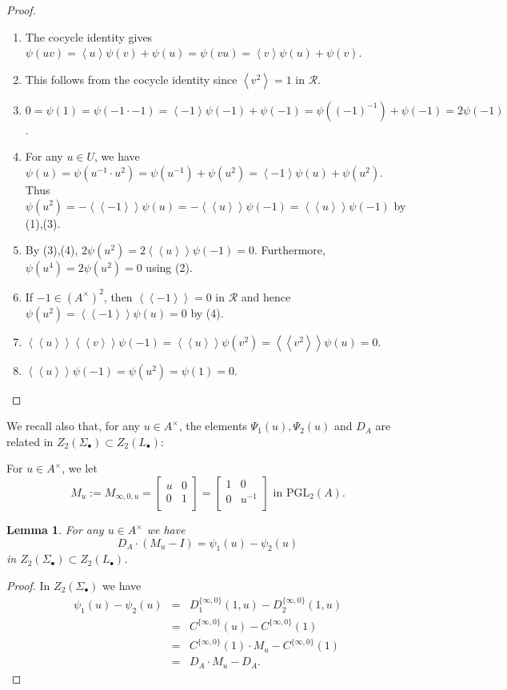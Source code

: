 \documentclass[12pt]{amsart}
\newtheorem{lem}{Lemma}[section]
\theoremstyle{definition}
\newcommand{\pgl}[2]{\mathrm{PGL}_{#1}(#2)}
\newcommand{\suss}[2]{\psi_{#1}\left( #2\right)}
\newcommand{\Suss}[2]{\Psi_{#1}\left( #2\right)}
\newcommand{\cconst}[1]{D_{#1}}
\newcommand{\<}{\langle}
\renewcommand{\>}{\rangle}
\newcommand{\an}[1]{\left\langle{#1}\right\rangle}
\newcommand{\pf}[1]{\left\langle\!\left\langle{#1}\right\rangle\!\right\rangle}
\begin{document}
\begin{proof}
\begin{enumerate}
\item The cocycle identity gives $\psi(uv)=\an{u}\psi(v)+\psi(u)=\psi(vu)=\an{v}\psi(u)+\psi(v)$.
\item This follows from the cocycle identity since $\an{v^2}=1$ in $\mathcal{R}$.
\item $0=\psi(1)=\psi(-1\cdot -1)=\an{-1}\psi(-1)+\psi(-1)=\psi((-1)^{-1})+\psi(-1)=2\psi(-1)$.
\item For any $u\in U$, we have $\psi(u)=\psi(u^{-1}\cdot u^2)=\psi(u^{-1})+\psi(u^2)=\an{-1}\psi(u)+\psi(u^2)$. Thus 
$\psi(u^2)=-\pf{-1}\psi(u)=-\pf{u}\psi(-1)=\pf{u}\psi(-1)$ by (1),(3).
\item By (3),(4), $2\psi(u^2)=2\pf{u}\psi(-1)=0$. Furthermore, $\psi(u^4)=2\psi(u^2)=0$ using (2).
\item If $-1\in (A^\times)^2$, then $\pf{-1}=0$ in $\mathcal{R}$ and hence $\psi(u^2)=\pf{-1}\psi(u)=0$ by (4).
\item $\pf{u}\pf{v}\psi(-1)=\pf{u}\psi(v^2)=\pf{v^2}\psi(u)=0$.
\item $\pf{u}\psi(-1)=\psi(u^2)=\psi(1)=0$.
\end{enumerate}
\end{proof}

We recall also that, for any $u\in A^\times$, the elements $\Suss{1}{u},\Suss{2}{u}$ and $\cconst{A}$ are related in $Z_2(\Sigma_\bullet)\subset Z_2(L_\bullet)$:

For $u\in A^\times$, we let
\[
M_u:=M_{\infty,0,u}= \left[
\begin{array}{cc}
u&0\\
0&1\\
\end{array}
\right]= \left[
\begin{array}{cc}
1&0\\
0&u^{-1}\\
\end{array}
\right]\mbox{ in } \pgl{2}{A}.
\]
\begin{lem}\label{lem:key} For any $u\in A^\times$ we have
\[
\cconst{A}\cdot \left( M_u-I\right)=\suss{1}{u}-\suss{2}{u}
\]
in $Z_2(\Sigma_\bullet)\subset Z_2(L_\bullet)$.
\end{lem}

\begin{proof} In $ Z_2(\Sigma_\bullet)$ we have 
\begin{eqnarray*}
\suss{1}{u}-\suss{2}{u}&=&D_1^{ \{ \infty,0\}}(1,u)-D_2^{ \{ \infty,0\}}(1,u)\\
&=& C^{ \{ \infty,0\}}(u)-C^{ \{ \infty,0\}}(1)\\
&=&C^{ \{ \infty,0\}}(1)\cdot M_u-C^{ \{ \infty,0\}}(1)\\
&=& \cconst{A}\cdot M_u-\cconst{A}.
\end{eqnarray*}
\end{proof}
\end{document}
